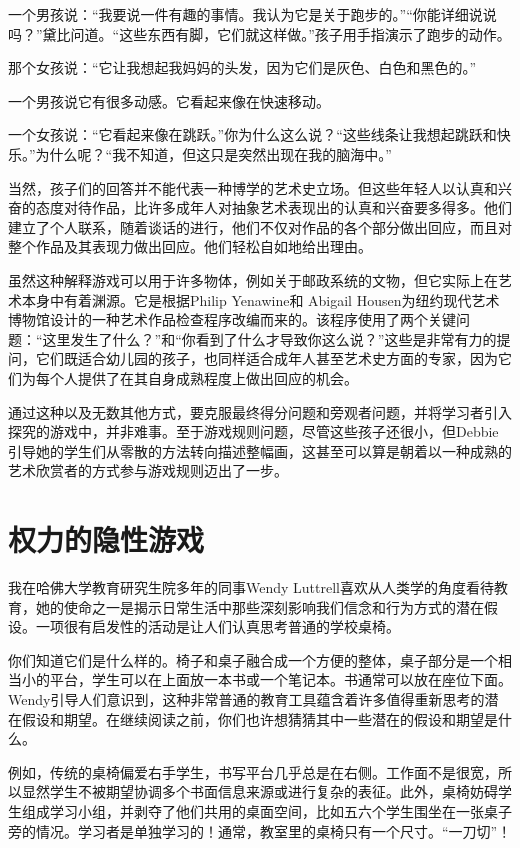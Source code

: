 一个男孩说：“我要说一件有趣的事情。我认为它是关于跑步的。”“你能详细说说吗？”黛比问道。“这些东西有脚，它们就这样做。”孩子用手指演示了跑步的动作。

那个女孩说：“它让我想起我妈妈的头发，因为它们是灰色、白色和黑色的。”

一个男孩说它有很多动感。它看起来像在快速移动。

一个女孩说：“它看起来像在跳跃。”你为什么这么说？“这些线条让我想起跳跃和快乐。”为什么呢？“我不知道，但这只是突然出现在我的脑海中。”

当然，孩子们的回答并不能代表一种博学的艺术史立场。但这些年轻人以认真和兴奋的态度对待作品，比许多成年人对抽象艺术表现出的认真和兴奋要多得多。他们建立了个人联系，随着谈话的进行，他们不仅对作品的各个部分做出回应，而且对整个作品及其表现力做出回应。他们轻松自如地给出理由。

虽然这种解释游戏可以用于许多物体，例如关于邮政系统的文物，但它实际上在艺术本身中有着渊源。它是根据Philip Yenawine和 Abigail Housen为纽约现代艺术博物馆设计的一种艺术作品检查程序改编而来的。该程序使用了两个关键问题：“这里发生了什么？”和“你看到了什么才导致你这么说？”这些是非常有力的提问，它们既适合幼儿园的孩子，也同样适合成年人甚至艺术史方面的专家，因为它们为每个人提供了在其自身成熟程度上做出回应的机会。

通过这种以及无数其他方式，要克服最终得分问题和旁观者问题，并将学习者引入探究的游戏中，并非难事。至于游戏规则问题，尽管这些孩子还很小，但Debbie引导她的学生们从零散的方法转向描述整幅画，这甚至可以算是朝着以一种成熟的艺术欣赏者的方式参与游戏规则迈出了一步。

\section*{权力的隐性游戏}

我在哈佛大学教育研究生院多年的同事Wendy Luttrell喜欢从人类学的角度看待教育，她的使命之一是揭示日常生活中那些深刻影响我们信念和行为方式的潜在假设。一项很有启发性的活动是让人们认真思考普通的学校桌椅。

你们知道它们是什么样的。椅子和桌子融合成一个方便的整体，桌子部分是一个相当小的平台，学生可以在上面放一本书或一个笔记本。书通常可以放在座位下面。Wendy引导人们意识到，这种非常普通的教育工具蕴含着许多值得重新思考的潜在假设和期望。在继续阅读之前，你们也许想猜猜其中一些潜在的假设和期望是什么。

例如，传统的桌椅偏爱右手学生，书写平台几乎总是在右侧。工作面不是很宽，所以显然学生不被期望协调多个书面信息来源或进行复杂的表征。此外，桌椅妨碍学生组成学习小组，并剥夺了他们共用的桌面空间，比如五六个学生围坐在一张桌子旁的情况。学习者是单独学习的！通常，教室里的桌椅只有一个尺寸。“一刀切”！

